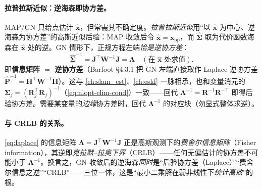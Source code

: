 \paragraph{拉普拉斯近似：逆海森即协方差。}\cite{barfoot2024state}
MAP/GN 只给点估计 $\hat{\mathbf{x}}$，但常需其不确定度。\emph{拉普拉斯近似}用“以 $\hat{\mathbf{x}}$ 为中心、逆海森为协方差”的高斯近似后验：MAP 收敛后令 $\hat{\mathbf{x}}=\mathbf{x}_{\mathrm{op}}$，而 $\hat{\boldsymbol{\Sigma}}$ 取为代价函数海森在 $\hat{\mathbf{x}}$ 处的逆。GN 情形下，正规方程左端\emph{恰是逆协方差}：
\begin{equation}
  \hat{\boldsymbol{\Sigma}}^{-1}=\mathbf{J}^\top\mathbf{W}^{-1}\mathbf{J}=\boldsymbol{\Lambda}\quad(\text{在 }\hat{\mathbf{x}}\text{ 处求值}).
  \label{eq:laplace}
\end{equation}
即\textbf{信息矩阵 $=$ 逆协方差}（Barfoot\cite{barfoot2024state} §4.3.1 把 GN 左端直接取作 Laplace 逆协方差 $\hat{\mathbf{P}}^{-1}=\mathbf{H}^\top\mathbf{W}^{-1}\mathbf{H}$）。这与 \cref{ch:slam_est}、\cref{ch:eskf} 一脉相承，也和变量消元的 $\boldsymbol{\Sigma}_j=(\mathbf{R}_j^\top\mathbf{R}_j)^{-1}$（\cref{eq:nlopt-elim-cond}）一致——回代 $\boldsymbol{\Lambda}^{-1}=\mathbf{R}^{-1}\mathbf{R}^{-\top}$ 即得后验协方差。需要某变量的\emph{边缘}协方差时，回代 $\boldsymbol{\Lambda}^{-1}$ 的对应块（勿显式整体求逆）。

\paragraph{与 CRLB 的关系。}
\cref{eq:laplace} 的信息矩阵 $\boldsymbol{\Lambda}=\mathbf{J}^\top\mathbf{W}^{-1}\mathbf{J}$ 正是高斯观测下的\emph{费舍尔信息矩阵}（Fisher information），其逆即\emph{克拉默--拉奥下界}（CRLB）——任何无偏估计的协方差不可能小于 $\boldsymbol{\Lambda}^{-1}$。换言之，GN 收敛后的逆海森\emph{同时}是“后验协方差（Laplace）”“费舍尔信息之逆”“CRLB”——三位一体，这是“最小二乘解在弱非线性下\emph{统计高效}”的根。

